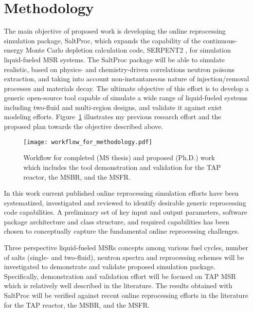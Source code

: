 \section{Methodology}
The main objective of proposed work is developing the online 
reprocessing simulation package, SaltProc, which expands the 
capability of the continuous-energy Monte Carlo depletion 
calculation code, SERPENT2 \cite{leppanen_serpent_2015}, for 
simulation liquid-fueled \gls{MSR} systems. The SaltProc package 
will be able to simulate realistic, based on physics- and 
chemistry-driven correlations neutron poisons extraction, 
and taking into account non-instantaneous 
nature of injection/removal processes and materials decay. 
The ultimate objective of this effort is to develop a generic 
open-source tool capable of simulate a wide range of 
liquid-fueled systems including two-fluid and multi-region 
designs, and validate it against exist modeling efforts. 
Figure~\ref{fig:workflow_method} illustrates my previous 
research effort and the proposed plan towards the objective 
described above.
\begin{figure}[htp!] %
  \centering
		  \texttt{[image: workflow\_for\_methodology.pdf]}
  \caption{Workflow for completed (MS thesis) and proposed (Ph.D.) work 
  which includes the tool demonstration and validation for the \gls{TAP} 
  reactor, the \gls{MSBR}, and the \gls{MSFR}.}
  \label{fig:workflow_method}
\end{figure}

In this work current published online reprocessing simulation efforts 
have been systematized, investigated and reviewed to identify desirable 
generic reprocessing code capabilities. A preliminary set of key input 
and output parameters, software package architecture and class 
structure, and required capabilities has been chosen to conceptually 
capture the fundamental online reprocessing challenges. 

Three perspective liquid-fueled \glspl{MSR} concepts among various 
fuel cycles, number of salts (single- and two-fluid), neutron 
spectra and reprocessing schemes will be investigated to 
demonstrate and validate proposed simulation package. Specifically, 
demonstration and validation effort will be focused on \gls{TAP} 
\gls{MSR} which is relatively well described in the literature. 
The results obtained with SaltProc will be verified against 
recent online reprocessing efforts in the literature for the 
\gls{TAP} reactor, the \gls{MSBR}, and the \gls{MSFR}. 